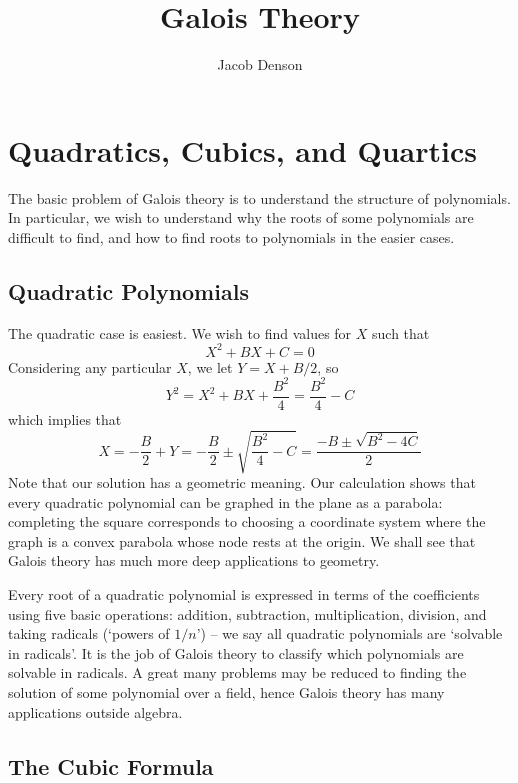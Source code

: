 

\title{Galois Theory}
\author{Jacob Denson}



\maketitle
\tableofcontents

\chapter{Quadratics, Cubics, and Quartics}


The basic problem of Galois theory is to understand the structure of polynomials. In particular, we wish to understand why the roots of some polynomials are difficult to find, and how to find roots to polynomials in the easier cases.

\section{Quadratic Polynomials}

The quadratic case is easiest. We wish to find values for $X$ such that
%
\[ X^2 + BX + C  = 0 \]
%
Considering any particular $X$, we let $Y = X + B/2$, so
%
\[ Y^2 = X^2 + BX + \frac{B^2}{4} = \frac{B^2}{4} - C \]
%
which implies that
%
\[ X = -\frac{B}{2} + Y = -\frac{B}{2} \pm \sqrt{\frac{B^2}{4} - C} = \frac{-B \pm \sqrt{B^2 - 4C}}{2} \]
%
Note that our solution has a geometric meaning. Our calculation shows that every quadratic polynomial can be graphed in the plane as a parabola: completing the square corresponds to choosing a coordinate system where the graph is a convex parabola whose node rests at the origin. We shall see that Galois theory has much more deep applications to geometry.

Every root of a quadratic polynomial is expressed in terms of the coefficients using five basic operations: addition, subtraction, multiplication, division, and taking radicals (`powers of $1/n$') -- we say all quadratic polynomials are `solvable in radicals'. It is the job of Galois theory to classify which polynomials are solvable in radicals. A great many problems may be reduced to finding the solution of some polynomial over a field, hence Galois theory has many applications outside algebra.

\section{The Cubic Formula}

